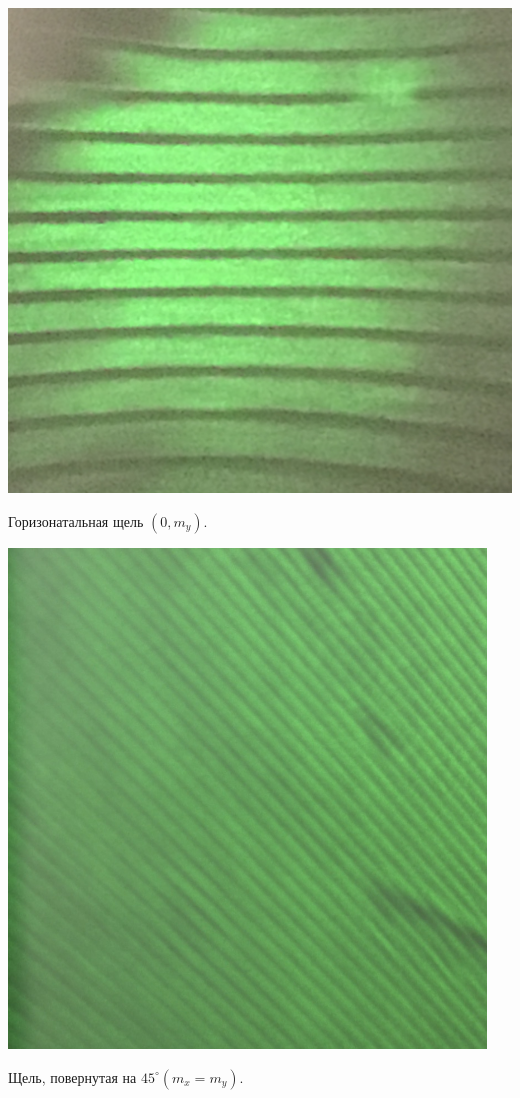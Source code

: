  \begin{minipage}{0.47\textwidth}
\begin{center}
\includegraphics[width = \textwidth]{4.JPG}
\end{center}

\begin{center}
Горизонатальная щель $\left(0, m_{y}\right)$. 
\end{center}
\end{minipage}
\begin{minipage}{0.47\textwidth}
\begin{center}
\includegraphics[width = 0.95\textwidth]{6.JPG}
\end{center}

\begin{center}
Щель, повернутая на $45^{\circ}\left(m_{x}=m_{y}\right)$. 
\end{center}
\end{minipage}
 
